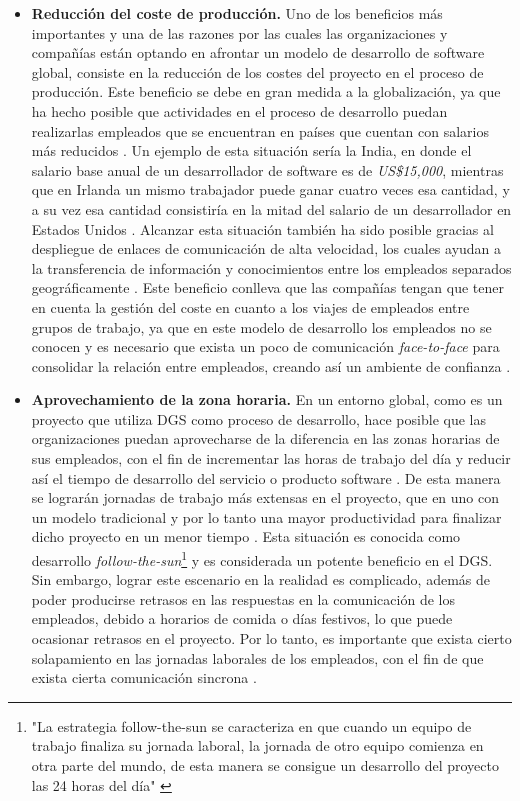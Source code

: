\begin{itemize}
	\item \textbf{Reducción del coste de producción.} Uno de los beneficios más importantes y una de las razones por las cuales las organizaciones y compañías están optando en afrontar un modelo de desarrollo de software global, consiste en la reducción de los costes del proyecto en el proceso de producción. Este beneficio se debe en gran medida a la globalización, ya que ha hecho posible que actividades en el proceso de desarrollo puedan realizarlas empleados que se encuentran en países que cuentan con salarios más reducidos \cite{aagerfalk2008benefits}. Un ejemplo de esta situación sería la India, en donde el salario base anual de un desarrollador de software es de \emph{US\$15,000}, mientras que en Irlanda un mismo trabajador puede ganar cuatro veces esa cantidad, y a su vez esa cantidad consistiría en la mitad del salario de un desarrollador en Estados Unidos \cite{conchuir2009global, conchuir2006exploring}. Alcanzar esta situación también ha sido posible gracias al despliegue de enlaces de comunicación de alta velocidad, los cuales ayudan a la transferencia de información y conocimientos entre los empleados separados geográficamente \cite{aagerfalk2008benefits}. Este beneficio conlleva que las compañías tengan que tener en cuenta la gestión del coste en cuanto a los viajes de empleados entre grupos de trabajo, ya que en este modelo de desarrollo los empleados no se conocen y es necesario que exista un poco de comunicación \emph{face-to-face} para consolidar la relación entre empleados, creando así un ambiente de confianza \cite{conchuir2009global, conchuir2006exploring}.
	
	\item \textbf{Aprovechamiento de la zona horaria.} En un entorno global, como es un proyecto que utiliza DGS como proceso de desarrollo, hace posible que las organizaciones puedan aprovecharse de la diferencia en las zonas horarias de sus empleados, con el fin de incrementar las horas de trabajo del día y reducir así el tiempo de desarrollo del servicio o producto software \cite{conchuir2006exploring, conchuir2009global}. De esta manera se lograrán jornadas de trabajo más extensas en el proyecto, que en uno con un modelo tradicional y por lo tanto una mayor productividad para finalizar dicho proyecto en un menor tiempo \cite{vizcaino2015vision}. Esta situación es conocida como desarrollo \emph{follow-the-sun}\footnote{"La estrategia follow-the-sun se caracteriza en que cuando un equipo de trabajo finaliza su jornada laboral, la jornada de otro equipo comienza en otra parte del mundo, de esta manera se consigue un desarrollo del proyecto las 24 horas del día" \cite{piattini2014desarrollo}} y es considerada un potente beneficio en el DGS. Sin embargo, lograr este escenario en la realidad es complicado, además de poder producirse retrasos en las respuestas en la comunicación de los empleados, debido a horarios de comida o días festivos, lo que puede ocasionar retrasos en el proyecto. Por lo tanto, es importante que exista cierto solapamiento en las jornadas laborales de los empleados, con el fin de que exista cierta comunicación sincrona \cite{conchuir2006exploring, conchuir2009global}.
	

\end{itemize}
